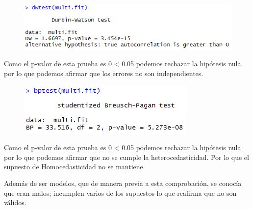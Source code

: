 \documentclass[a4paper,10pt,twocolumn]{article}
\begin{document}
\begin{itemize}


			\begin{figure}[H]
				\begin{center}
					\includegraphics[width=.92\columnwidth,right]{figures/sup7.png}
				\end{center}
			\end{figure}

			Como el p-valor de esta prueba es 0 < 0.05 podemos rechazar la hipótesis nula por lo que 
			podemos afirmar que los errores no son independientes. 




			\begin{figure}[H]
				\begin{center}
					\includegraphics[width=.92\columnwidth,right]{figures/sup8.png}
				\end{center}
			\end{figure}

			Como el p-valor de esta prueba es 0 < 0.05 podemos rechazar la hipótesis nula por lo que podemos 
			afirmar que no se cumple la heterocedasticidad. Por lo que el supuesto de Homocedasticidad no se mantiene.
	\end{itemize}

	Además de ser modelos, que de manera previa a esta comprobación, se conocía que eran malos; incumplen varios de los supuestos lo que reafirma que no son válidos.
\end{document}
